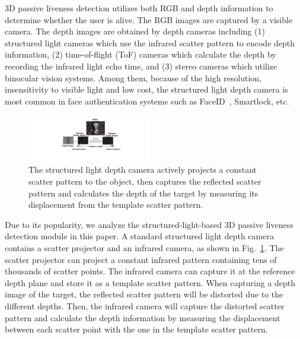 3D passive liveness detection utilizes both RGB and depth information to determine whether the user is alive.  The RGB images are captured by a visible camera. The depth images are obtained by depth cameras including (1) structured light cameras which use the infrared scatter pattern to encode depth information, (2) time-of-flight (ToF) cameras which calculate the depth by recording the infrared light echo time, and (3) stereo cameras which utilize binocular vision systems. Among them, because of the high resolution, insensitivity to visible light and low cost, the structured light depth camera is most common in face authentication systems such as FaceID~\cite{han2007face,bud2018facing}, Smartlock\cite{waseem2020face}, etc.

\begin{figure}[pt] 
	\centerline{\includegraphics[width = 0.48\textwidth]{figures/structured_light_camera.pdf}}
	\vspace{-0.1in}
	\caption{The structured light depth camera actively projects a constant scatter pattern to the object, then captures the reflected scatter pattern and calculates the depth of the target by measuring its displacement from the template scatter pattern. }
	\label{depth_camera}
	\vspace{-0.15in}
\end{figure}

Due to its popularity, we analyze the structured-light-based 3D passive liveness detection module in this paper.
A standard structured light depth camera contains a scatter projector and an infrared camera, as shown in Fig.~\ref{depth_camera}. The scatter projector can project a  constant infrared pattern containing tens of thousands of scatter points. The infrared camera can capture it at the reference depth plane and store it as a template scatter pattern. 
When capturing a depth image of the target, the reflected scatter pattern will be distorted due to the different depths. Then, the infrared camera will capture the distorted scatter pattern and calculate the depth information by measuring the displacement between each scatter point with the one in the template scatter pattern.

